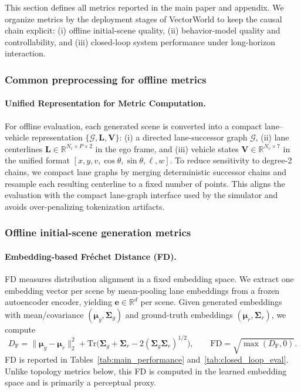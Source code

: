 \documentclass{article}
\theoremstyle{plain}
\theoremstyle{definition}
\theoremstyle{remark}
\begin{document}
This section defines all metrics reported in the main paper and appendix.
We organize metrics by the deployment stages of VectorWorld to keep the causal chain explicit:
(i) offline initial-scene quality, (ii) behavior-model quality and controllability, and
(iii) closed-loop system performance under long-horizon interaction.

\subsubsection{Common preprocessing for offline metrics}

\paragraph{Unified Representation for Metric Computation.}
For offline evaluation, each generated scene is converted into a compact lane--vehicle representation
\(\{\mathcal{G}, \mathbf{L}, \mathbf{V}\}\):
(i) a directed lane-successor graph \(\mathcal{G}\),
(ii) lane centerlines \(\mathbf{L} \in \mathbb{R}^{N_{\ell}\times P\times 2}\) in the ego frame, and
(iii) vehicle states \(\mathbf{V} \in \mathbb{R}^{N_{v}\times 7}\) in the unified format
\([x, y, v, \cos\theta, \sin\theta, \ell, w]\).
To reduce sensitivity to degree-2 chains, we compact lane graphs by merging deterministic successor chains and resample each
resulting centerline to a fixed number of points. This aligns the evaluation with the compact lane-graph interface used by
the simulator and avoids over-penalizing tokenization artifacts.

\subsubsection{Offline initial-scene generation metrics}

\paragraph{Embedding-based Fr\'echet Distance (FD).}
FD measures distribution alignment in a fixed embedding space.
We extract one embedding vector per scene by mean-pooling lane embeddings from a frozen autoencoder encoder, yielding
\(\mathbf{e}\in\mathbb{R}^{d}\) per scene.
Given generated embeddings with mean/covariance \((\boldsymbol{\mu}_{g}, \boldsymbol{\Sigma}_{g})\) and ground-truth embeddings
\((\boldsymbol{\mu}_{r}, \boldsymbol{\Sigma}_{r})\), we compute
\[
D_{\mathrm{F}} =
\lVert \boldsymbol{\mu}_{g}-\boldsymbol{\mu}_{r}\rVert_{2}^{2}
+
\mathrm{Tr}\!\Big(\boldsymbol{\Sigma}_{g}+\boldsymbol{\Sigma}_{r}
-2(\boldsymbol{\Sigma}_{g}\boldsymbol{\Sigma}_{r})^{1/2}\Big),
\qquad
\mathrm{FD}=\sqrt{\max(D_{\mathrm{F}},0)}.
\]
FD is reported in Tables~\ref{tab:main_performance} and~\ref{tab:closed_loop_eval}.
Unlike topology metrics below, this FD is computed in the learned embedding space and is primarily a perceptual proxy.
\end{document}

